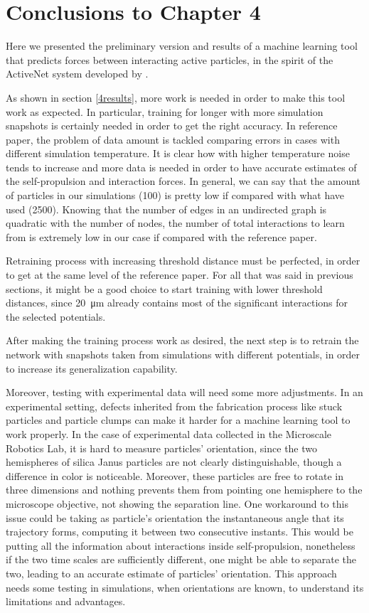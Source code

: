 \documentclass[../../master_thesis_np.tex]{subfiles}
\begin{document}
\section{Conclusions to Chapter 4}

Here we presented the preliminary version and results of a machine learning tool that predicts forces between interacting active particles, in the spirit of the ActiveNet system developed by \citeauthor{ruiz-garcia_discovering_2024}.

As shown in section \ref{4results}, more work is needed in order to make this tool work as expected.
In particular, training for longer with more simulation snapshots is certainly needed in order to get the right accuracy.
In reference paper, the problem of data amount is tackled comparing errors in cases with different simulation temperature.
It is clear how with higher temperature noise tends to increase and more data is needed in order to have accurate estimates of the self-propulsion and interaction forces.
In general, we can say that the amount of particles in our simulations (100) is pretty low if compared with what \citeauthor{ruiz-garcia_discovering_2024} have used (2500).
Knowing that the number of edges in an undirected graph is quadratic with the number of nodes, the number of total interactions to learn from is extremely low in our case if compared with the reference paper.

Retraining process with increasing threshold distance must be perfected, in order to get at the same level of the reference paper.
For all that was said in previous sections, it might be a good choice to start training with lower threshold distances, since \SI{20}{\um} already contains most of the significant interactions for the selected potentials. 

After making the training process work as desired, the next step is to retrain the network with snapshots taken from simulations with different potentials, in order to increase its generalization capability.

Moreover, testing with experimental data will need some more adjustments.
In an experimental setting, defects inherited from the fabrication process like stuck particles and particle clumps can make it harder for a machine learning tool to work properly.
In the case of experimental data collected in the Microscale Robotics Lab, it is hard to measure particles' orientation, since the two hemispheres of silica Janus particles are not clearly distinguishable, though a difference in color is noticeable.
Moreover, these particles are free to rotate in three dimensions and nothing prevents them from pointing one hemisphere to the microscope objective, not showing the separation line.
One workaround to this issue could be taking as particle's orientation the instantaneous angle that its trajectory forms, computing it between two consecutive instants.
This would be putting all the information about interactions inside self-propulsion, nonetheless if the two time scales are sufficiently different, one might be able to separate the two, leading to an accurate estimate of particles' orientation.
This approach needs some testing in simulations, when orientations are known, to understand its limitations and advantages.
\end{document}
